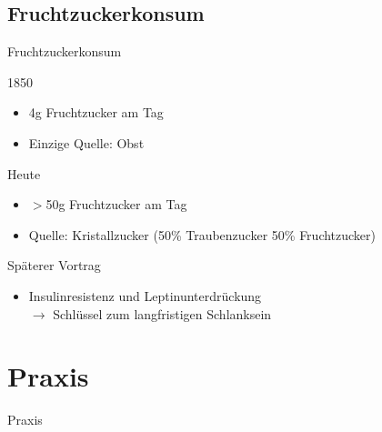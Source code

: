 \documentclass[xcolor=dvipsnames]{beamer}
\begin{document}
    \subsection{Fruchtzuckerkonsum}
    \begin{frame}{Fruchtzuckerkonsum}
        \begin{block}{1850}
            \begin{itemize}
                \setlength\itemsep{1em}
                \item 4g Fruchtzucker am Tag
                \item Einzige Quelle: Obst
            \end{itemize}
        \end{block}

        \begin{block}{Heute}
            \begin{itemize}
                \setlength\itemsep{1em}
                \item $>$50g Fruchtzucker am Tag
                \item Quelle: Kristallzucker (50\% Traubenzucker 50\% Fruchtzucker)
            \end{itemize}
        \end{block}

        \begin{block}{Späterer Vortrag}
            \begin{itemize}
                \setlength\itemsep{1em}
                \item Insulinresistenz und Leptinunterdrückung\\ $\rightarrow$ Schlüssel zum langfristigen Schlanksein
            \end{itemize}
        \end{block}
    \end{frame}

    \section{Praxis}
    {
        \begin{frame}
            \begin{center}
                \Huge Praxis
            \end{center}
        \end{frame}
    }
\end{document}
